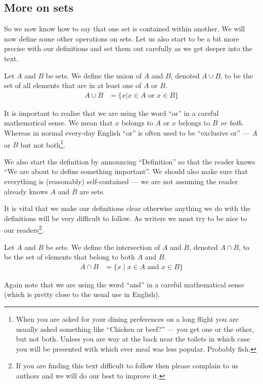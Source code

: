 \subsection*{More on sets}
So we now know how to say that one set is contained within another. We will now
define some other operations on sets. Let us also start to be a bit more precise
with our definitions and set them out carefully as we get deeper into the
text.
\begin{defn}
 Let $A$ and $B$ be sets. We define the union of $A$ and $B$, denoted $A \cup
B$, to be the set of all elements that are in at least one of $A$ or $B$.
\begin{align*}
  A \cup B &= \{x | x\in A \mbox{ or } x \in B \}
\end{align*}
\end{defn}
It is important to realise that we are using the word ``or'' in a careful
mathematical sense. We mean that $x$ belongs to $A$ or $x$ belongs to $B$
\emph{or both}. Whereas in normal every-day English ``or'' is often used to be
``exclusive or'' --- $A$ or $B$ but not both\footnote{When you are asked for
your dining preferences on a long flight you are usually asked something
like ``Chicken or beef?'' --- you get one or the other, but not both. Unless
you are way at the back near the toilets in which case you will be presented
with which ever meal was less popular. Probably fish.}.

We also start the definition by announcing ``Definition''
so that the reader knows ``We are about to define something important''. We
should also make sure that everything is (reasonably) self-contained --- we are
not assuming the reader already knows $A$ and $B$ are sets.

It is vital that we make our definitions clear otherwise anything we do with the
definitions will be very difficult to follow. As writers we must try to be nice
to our readers\footnote{If you are finding this text difficult to follow then
please complain to us authors and we will do our best to improve it.}.

\begin{defn}
 Let $A$ and $B$ be sets. We define the intersection of $A$ and $B$, denoted $A
\cap B$, to be the set of elements that belong to both $A$ and $B$.
\begin{align*}
 A \cap B &= \{ x \;|\; x\in A \mbox{ and } x \in B \}
\end{align*}
\end{defn}
Again note that we are using the word ``and'' in a careful mathematical sense
(which is pretty close to the usual use in English).

